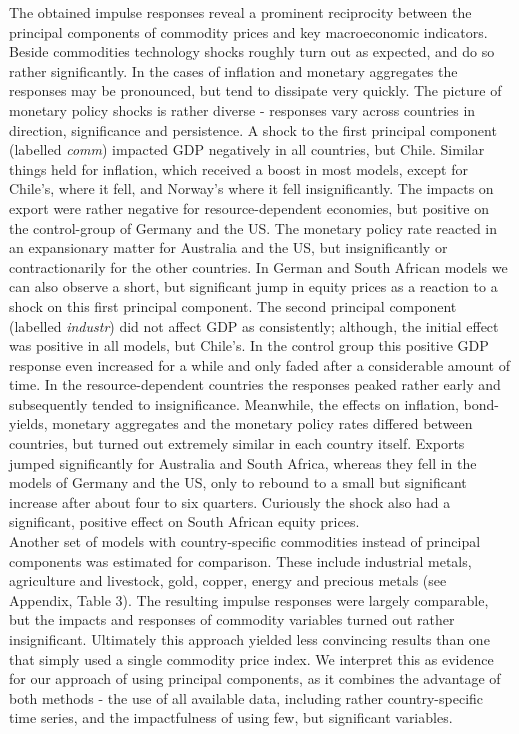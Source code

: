 \documentclass[12pt,]{article}
\begin{document}
The obtained impulse responses reveal a prominent reciprocity between
the principal components of commodity prices and key macroeconomic
indicators. Beside commodities technology shocks roughly turn out as
expected, and do so rather significantly. In the cases of inflation and
monetary aggregates the responses may be pronounced, but tend to
dissipate very quickly. The picture of monetary policy shocks is rather
diverse - responses vary across countries in direction, significance and
persistence. A shock to the first principal component (labelled
\emph{comm}) impacted GDP negatively in all countries, but Chile.
Similar things held for inflation, which received a boost in most
models, except for Chile's, where it fell, and Norway's where it fell
insignificantly. The impacts on export were rather negative for
resource-dependent economies, but positive on the control-group of
Germany and the US. The monetary policy rate reacted in an expansionary
matter for Australia and the US, but insignificantly or contractionarily
for the other countries. In German and South African models we can also
observe a short, but significant jump in equity prices as a reaction to
a shock on this first principal component. The second principal
component (labelled \emph{industr}) did not affect GDP as consistently;
although, the initial effect was positive in all models, but Chile's. In
the control group this positive GDP response even increased for a while
and only faded after a considerable amount of time. In the
resource-dependent countries the responses peaked rather early and
subsequently tended to insignificance. Meanwhile, the effects on
inflation, bond-yields, monetary aggregates and the monetary policy
rates differed between countries, but turned out extremely similar in
each country itself. Exports jumped significantly for Australia and
South Africa, whereas they fell in the models of Germany and the US,
only to rebound to a small but significant increase after about four to
six quarters. Curiously the shock also had a significant, positive
effect on South African equity prices.\\
Another set of models with country-specific commodities instead of
principal components was estimated for comparison. These include
industrial metals, agriculture and livestock, gold, copper, energy and
precious metals (see Appendix, Table 3). The resulting impulse responses
were largely comparable, but the impacts and responses of commodity
variables turned out rather insignificant. Ultimately this approach
yielded less convincing results than one that simply used a single
commodity price index. We interpret this as evidence for our approach of
using principal components, as it combines the advantage of both methods
- the use of all available data, including rather country-specific time
series, and the impactfulness of using few, but significant variables.
\end{document}
